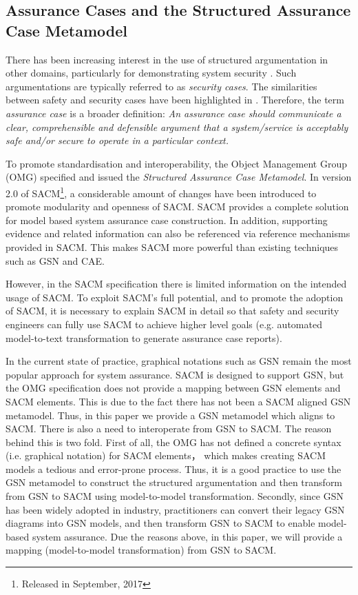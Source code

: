 \subsection{Assurance Cases and the Structured Assurance Case Metamodel}
There has been increasing interest in the use of structured argumentation in other domains, particularly for demonstrating system security \cite{bloomfield2010safety}. Such argumentations are typically referred to as \textit{security cases}. The similarities between safety and security cases have been highlighted in \cite{lautieri2005safsec}. Therefore, the term \textit{assurance case} is a broader definition: \textit{An assurance case should communicate a clear, comprehensible and defensible argument that a system/service is acceptably safe and/or secure to operate in a particular context.} 

To promote standardisation and interoperability, the Object Management Group (OMG) specified and issued the \textit{Structured Assurance Case Metamodel}. In version 2.0 of SACM\footnote{Released in September, 2017}, a considerable amount of changes have been introduced to promote modularity and openness of SACM. SACM provides a complete solution for model based system assurance case construction. In addition, supporting evidence and related information can also be referenced via reference mechanisms provided in SACM. This makes SACM more powerful than existing techniques such as GSN and CAE.

However, in the SACM specification there is limited information on the intended usage of SACM. To exploit SACM's full potential, and to promote the adoption of SACM, it is necessary to explain SACM in detail so that safety and security engineers can fully use SACM to achieve higher level goals (e.g. automated model-to-text transformation to generate assurance case reports). 

In the current state of practice, graphical notations such as GSN remain the most popular approach for system assurance. 
SACM is designed to support GSN, but the OMG specification does not provide a mapping between GSN elements and SACM elements. 
This is due to the fact there has not been a SACM aligned GSN metamodel. 
Thus, in this paper we provide a GSN metamodel which aligns to SACM. 
There is also a need to interoperate from GSN to SACM.
The reason behind this is two fold. First of all, the OMG has not defined a concrete syntax (i.e. graphical notation) for SACM elements， which makes creating SACM models a tedious and error-prone process. Thus, it is a good practice to use the GSN metamodel to construct the structured argumentation and then transform from GSN to SACM using model-to-model transformation. Secondly, since GSN has been widely adopted in industry, practitioners can convert their legacy GSN diagrams into GSN models, and then transform GSN to SACM to enable model-based system assurance. 
Due the reasons above, in this paper, we will provide a mapping (model-to-model transformation) from GSN to SACM.


